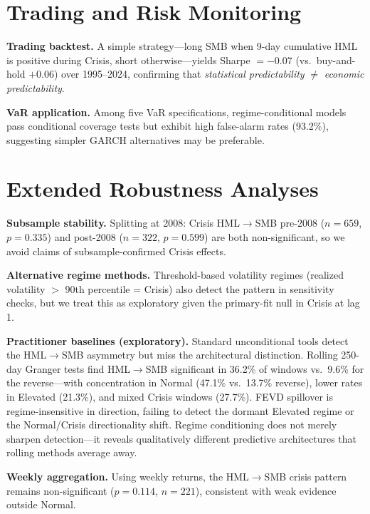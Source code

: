 \documentclass[sigconf,anonymous]{acmart}
\begin{document}
\section{Trading and Risk Monitoring}
\label{app:trading}
\label{app:var}
\label{alg:monitor}\label{tab:algo_params}\label{tab:hybrid_sensitivity}\label{tab:var_hybrid}\label{fig:hybrid_detector}

\textbf{Trading backtest.}
A simple strategy---long SMB when 9-day cumulative HML is positive during
Crisis, short otherwise---yields Sharpe $= -0.07$ (vs.\ buy-and-hold
$+0.06$) over 1995--2024, confirming that \emph{statistical predictability}
$\neq$ \emph{economic predictability}.

\textbf{VaR application.}
Among five VaR specifications, regime-conditional models pass conditional coverage tests but exhibit high false-alarm rates (93.2\%), suggesting simpler GARCH alternatives may be preferable.

\section{Extended Robustness Analyses}
\label{app:robustness}

\textbf{Subsample stability.} Splitting at 2008: Crisis HML$\to$SMB
pre-2008 ($n = 659$, $p = 0.335$) and post-2008 ($n = 322$, $p = 0.599$)
are both non-significant, so we avoid claims of subsample-confirmed Crisis effects.

\textbf{Alternative regime methods.} Threshold-based volatility regimes
(realized volatility $>$ 90th percentile = Crisis) also detect the pattern
in sensitivity checks, but we treat this as exploratory given the primary-fit
null in Crisis at lag 1.

\textbf{Practitioner baselines (exploratory).} Standard unconditional tools detect the HML$\to$SMB
asymmetry but miss the architectural distinction. Rolling 250-day Granger tests
find HML$\to$SMB significant in 36.2\% of windows vs.\ 9.6\% for the
reverse---with concentration in Normal (47.1\% vs.\ 13.7\% reverse),
lower rates in Elevated (21.3\%), and mixed Crisis windows (27.7\%).
FEVD spillover is regime-insensitive in direction,
failing to detect the dormant Elevated regime or the Normal/Crisis directionality
shift. Regime conditioning does not merely sharpen detection---it reveals
qualitatively different predictive architectures that rolling methods average away.

\textbf{Weekly aggregation.} Using weekly returns, the HML$\to$SMB crisis pattern
remains non-significant ($p = 0.114$, $n = 221$), consistent with weak
evidence outside Normal.
\end{document}
